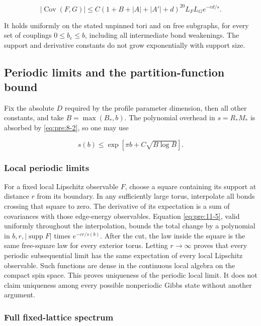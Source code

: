 \begin{equation}
\boxed{\quad
|\operatorname{Cov}(F,G)|
\leq C(1+B+|A|+|A'|+d)^{20}L_FL_G e^{-cd/s}.
\quad}
\label{eq:pre:11-5}
\end{equation}

It holds uniformly on the stated unpinned tori and on free subgraphs, for every set of couplings \(0\leq b_e\leq b\), including all intermediate bond weakenings. The support and derivative constants do not grow exponentially with support size.


\subsection{Periodic limits and the partition-function bound}\label{pre:conclusion}

Fix the absolute \(D\) required by the profile parameter dimension, then all other constants, and take \(B=\max(B_*,b)\). The polynomial overhead in \(s=R_*M_*\) is absorbed by \eqref{eq:pre:8-2}, so one may use

\begin{equation}
s(b)\leq\exp[\pi b+C\sqrt{B\log B}].
\label{eq:pre:12-1}
\end{equation}

\subsubsection{Local periodic limits}\label{pre:part-12-1}

For a fixed local Lipschitz observable \(F\), choose a square containing its support at distance \(r\) from its boundary. In any sufficiently large torus, interpolate all bonds crossing that square to zero. The derivative of its expectation is a sum of covariances with those edge-energy observables. Equation \eqref{eq:pre:11-5}, valid uniformly throughout the interpolation, bounds the total change by a polynomial in \(b,r,|\operatorname{supp}F|\) times \(e^{-cr/s(b)}\). After the cut, the law inside the square is the same free-square law for every exterior torus. Letting \(r\to\infty\) proves that every periodic subsequential limit has the same expectation of every local Lipschitz observable. Such functions are dense in the continuous local algebra on the compact spin space. This proves uniqueness of the periodic local limit. It does not claim uniqueness among every possible nonperiodic Gibbs state without another argument.

\subsubsection{Full fixed-lattice spectrum}\label{pre:part-12-2}

